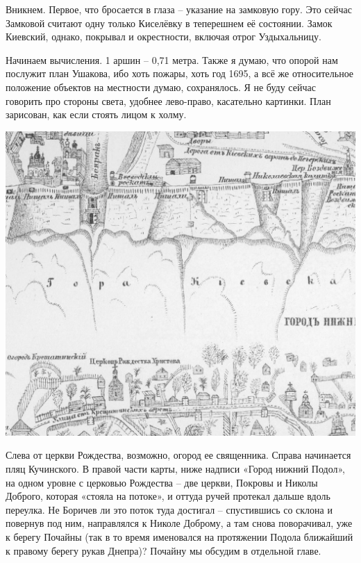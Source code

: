Вникнем. Первое, что бросается в глаза – указание на замковую гору. Это сейчас Замковой считают одну только Киселёвку в теперешнем её состоянии. Замок Киевский, однако, покрывал и окрестности, включая отрог Уздыхальницу.

Начинаем вычисления. 1 аршин – 0,71 метра. Также я думаю, что опорой нам послужит план Ушакова, ибо хоть пожары, хоть год 1695, а всё же относительное положение объектов на местности думаю, сохранялось. Я не буду сейчас говорить про стороны света, удобнее лево-право, касательно картинки. План зарисован, как если стоять лицом к холму.


\begin{center}
\includegraphics[width=\linewidth]{chast-colebanie-osnov/borichev-tok/1695-kuch.jpg}
\end{center}

Слева от церкви Рождества, возможно, огород ее священника. Справа начинается пляц Кучинского. В правой части карты, ниже надписи «Город нижний Подол», на одном уровне с церковью Рождества – две церкви, Покровы и Николы Доброго, которая «стояла на потоке», и оттуда ручей протекал дальше вдоль переулка. Не Боричев ли это поток туда достигал – спустившись со склона и повернув под ним, направлялся к Николе Доброму, а там снова поворачивал, уже к берегу Почайны (так в то время именовался на протяжении Подола ближайший к правому берегу рукав Днепра)? Почайну мы обсудим в отдельной главе.
 
